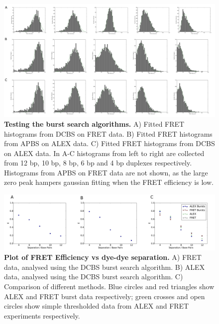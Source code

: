 \begin{figure}[!ht]
   \begin{center}
      \includegraphics*[clip=true, width=6in]{pyFRET/burst_search.pdf}
      \caption{{\bf Testing the burst search algorithms.} A) Fitted FRET histograms from DCBS on FRET data. B) Fitted FRET histograms from APBS on ALEX data. C) Fitted FRET histograms from DCBS on ALEX data. In A-C histograms from left to right are collected from 12 bp, 10 bp, 8 bp, 6 bp and 4 bp duplexes respectively. Histograms from APBS on FRET data are not shown, as the large zero peak hampers gaussian fitting when the FRET efficiency is low.}
      \label{fig:burst_search}
   \end{center}
\end{figure}


\begin{figure}[!ht]
   \begin{center}
      \includegraphics*[clip=true, width=6in]{pyFRET/Bp_vs_E.pdf}
      \caption{{\bf Plot of FRET Efficiency vs dye-dye separation.} A) FRET data, analysed using the DCBS burst search algorithm. B) ALEX data, analysed using the DCBS burst search algorithm. C) Comparison of different methods. Blue circles and red triangles show ALEX and FRET burst data respectively; green crosses and open circles show simple thresholded data from ALEX and FRET experiments respectively.}
      \label{fig:fig6_Eplots}
   \end{center}
\end{figure}

